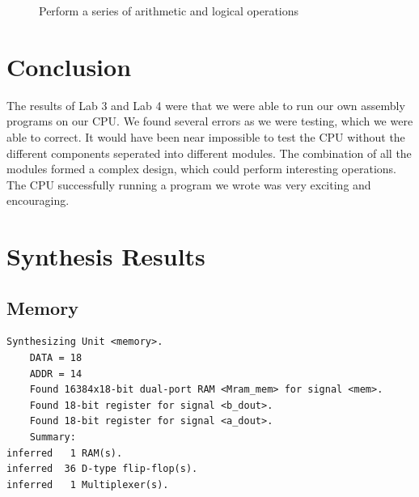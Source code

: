 \documentclass[11pt]{article}
\begin{document}
\begin{center}
\begin{figure}
\caption{Perform a series of arithmetic and logical operations}
\label{fig:p5}
\end{figure} 
\end{center}

\section{Conclusion}
The results of Lab 3 and Lab 4 were that we were able to run our own assembly programs on our CPU. We found several errors as we were testing, which we were able to correct. It would have been near impossible to test the CPU without the different components seperated into different modules. The combination of all the modules formed a complex design, which could perform interesting operations. The CPU successfully running a program we wrote was very exciting and encouraging. 


\newpage
\appendixname
\appendix
\section{Synthesis Results}
\subsection{Memory}
\begin{lstlisting}
Synthesizing Unit <memory>.
    DATA = 18
    ADDR = 14
    Found 16384x18-bit dual-port RAM <Mram_mem> for signal <mem>.
    Found 18-bit register for signal <b_dout>.
    Found 18-bit register for signal <a_dout>.
    Summary:
inferred   1 RAM(s).
inferred  36 D-type flip-flop(s).
inferred   1 Multiplexer(s).
\end{lstlisting}
\end{document}
